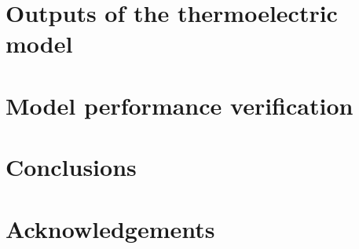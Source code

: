 \documentclass[preprint]{elsarticle/elsarticle}
\begin{document}
\section{Outputs of the thermoelectric model}


\section{Model performance verification}


\section{Conclusions}


\section{Acknowledgements}




\end{document}
